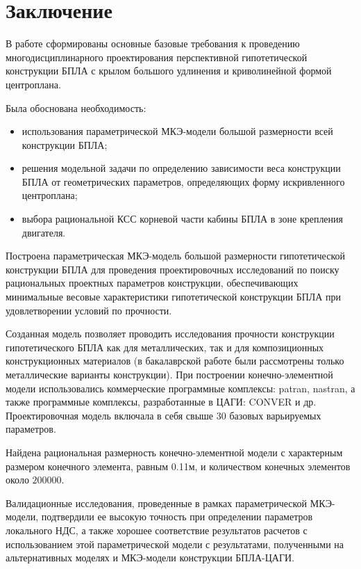 \chapter*{Заключение}

В работе сформированы основные базовые требования к проведению многодисциплинарного проектирования перспективной гипотетической конструкции БПЛА с крылом большого удлинения и криволинейной формой центроплана. 

Была обоснована необходимость:
\begin{itemize}
\item использования параметрической МКЭ-модели большой размерности всей конструкции БПЛА;
\item решения модельной задачи по определению зависимости веса конструкции БПЛА от геометрических параметров, определяющих форму искривленного центроплана;
\item выбора рациональной КСС корневой части кабины БПЛА в зоне крепления двигателя.
\end{itemize}

Построена параметрическая МКЭ-модель большой размерности гипотетической конструкции БПЛА для проведения проектировочных исследований по поиску рациональных проектных параметров конструкции, обеспечивающих минимальные весовые характеристики гипотетической конструкции БПЛА при удовлетворении условий по прочности. 

Созданная модель позволяет проводить исследования прочности конструкции гипотетического БПЛА как для металлических, так и для композиционных конструкционных материалов (в бакалаврской работе были рассмотрены только металлические варианты конструкции). При построении конечно-элементной модели использовались коммерческие программные комплексы: patran, nastran, а также программные комплексы, разработанные в ЦАГИ: CONVER и др.
Проектировочная модель  включала в себя свыше 30 базовых варьируемых параметров. 

Найдена рациональная размерность конечно-элементной модели с характерным размером конечного элемента, равным 0.11м, и количеством конечных элементов около $200000$. 

Валидационные исследования, проведенные в рамках параметрической МКЭ-модели, подтвердили ее высокую точность при определении параметров локального НДС, а также хорошее соответствие результатов расчетов с использованием этой параметрической модели с результатами, полученными на альтернативных моделях и МКЭ-модели конструкции БПЛА-ЦАГИ. 


